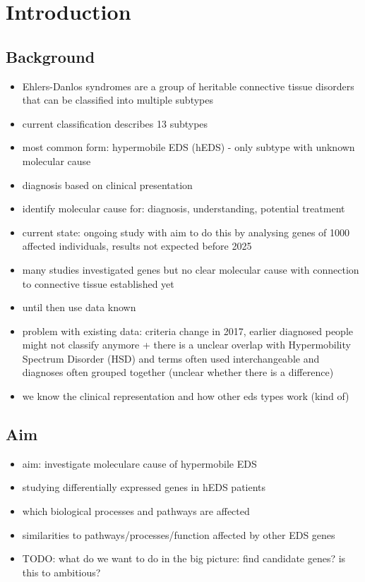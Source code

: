 \section{Introduction}

\subsection{Background}

\begin{itemize}
	\item Ehlers-Danlos syndromes are a group of heritable connective tissue disorders that can be classified into multiple subtypes
	\item current classification describes 13 subtypes \cite{classification2017}
	\item most common form: hypermobile EDS (hEDS) - only subtype with unknown molecular cause
	\item diagnosis based on clinical presentation
	\item identify molecular cause for: diagnosis, understanding, potential treatment \cite{Ritelli2020}
	\item current state: ongoing study with aim to do this by analysing genes of 1000 affected individuals, results not expected before 2025 \cite{HEDGE}
	\item many studies investigated genes but no clear molecular cause with connection to connective tissue established yet \cite{Caliogna2021}
	\item until then use data known
	\item problem with existing data: criteria change in 2017, earlier diagnosed people might not classify anymore \cite{Gensemer2021} + there is a unclear overlap with Hypermobility Spectrum Disorder (HSD) and terms often used interchangeable and diagnoses often grouped together (unclear whether there is a difference) \cite{Gensemer2021, Ritelli2022}
	\item we know the clinical representation and how other eds types work (kind of)
\end{itemize}

\subsection{Aim}

\begin{itemize}
	\item aim: investigate moleculare cause of hypermobile EDS
	\item studying differentially expressed genes in hEDS patients
	\item which biological processes and pathways are affected
	\item similarities to pathways/processes/function affected by other EDS genes
	\item TODO: what do we want to do in the big picture: find candidate genes? is this to ambitious?
\end{itemize}